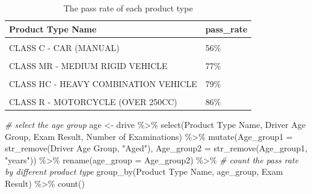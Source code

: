 \documentclass[11pt,a4paper,]{article}
\newenvironment{Shaded}{\begin{snugshade}}{\end{snugshade}}
\newcommand{\AttributeTok}[1]{\textcolor[rgb]{0.77,0.63,0.00}{#1}}
\newcommand{\CommentTok}[1]{\textcolor[rgb]{0.56,0.35,0.01}{\textit{#1}}}
\newcommand{\FunctionTok}[1]{\textcolor[rgb]{0.00,0.00,0.00}{#1}}
\newcommand{\NormalTok}[1]{#1}
\newcommand{\OtherTok}[1]{\textcolor[rgb]{0.56,0.35,0.01}{#1}}
\newcommand{\SpecialCharTok}[1]{\textcolor[rgb]{0.00,0.00,0.00}{#1}}
\newcommand{\StringTok}[1]{\textcolor[rgb]{0.31,0.60,0.02}{#1}}
\begin{document}
\begin{table}[!h]

\caption{\label{tab:unnamed-chunk-4}The pass rate of each product type}
\centering
\begin{tabular}[t]{ll}
\toprule
Product Type Name & pass\_rate\\
\midrule
\cellcolor{gray!6}{CLASS CA - CAR (AUTOMATIC)} & \cellcolor{gray!6}{53\%}\\
CLASS C - CAR (MANUAL) & 56\%\\
\cellcolor{gray!6}{CLASS HR - HEAVY RIGID VEHICLE} & \cellcolor{gray!6}{70\%}\\
CLASS MR - MEDIUM RIGID VEHICLE & 77\%\\
\cellcolor{gray!6}{CLASS RE - MOTORCYCLE (UP TO 250CC} & \cellcolor{gray!6}{77\%}\\
\addlinespace
CLASS HC - HEAVY COMBINATION VEHICLE & 79\%\\
\cellcolor{gray!6}{CLASS LR - LIGHT RIGID VEHICLE} & \cellcolor{gray!6}{83\%}\\
CLASS R - MOTORCYCLE (OVER 250CC) & 86\%\\
\bottomrule
\end{tabular}
\end{table}

\begin{Shaded}
\begin{Highlighting}[]
\CommentTok{\# select the age group}
\NormalTok{age }\OtherTok{\textless{}{-}}\NormalTok{ drive }\SpecialCharTok{\%\textgreater{}\%}
  \FunctionTok{select}\NormalTok{(}\StringTok{\textasciigrave{}}\AttributeTok{Product Type Name}\StringTok{\textasciigrave{}}\NormalTok{, }\StringTok{\textasciigrave{}}\AttributeTok{Driver Age Group}\StringTok{\textasciigrave{}}\NormalTok{, }\StringTok{\textasciigrave{}}\AttributeTok{Exam Result}\StringTok{\textasciigrave{}}\NormalTok{, }\StringTok{\textasciigrave{}}\AttributeTok{Number of Examinations}\StringTok{\textasciigrave{}}\NormalTok{) }\SpecialCharTok{\%\textgreater{}\%}
  \FunctionTok{mutate}\NormalTok{(}\AttributeTok{Age\_group1 =} \FunctionTok{str\_remove}\NormalTok{(}\StringTok{\textasciigrave{}}\AttributeTok{Driver Age Group}\StringTok{\textasciigrave{}}\NormalTok{, }\StringTok{"Aged"}\NormalTok{),}
         \AttributeTok{Age\_group2 =} \FunctionTok{str\_remove}\NormalTok{(Age\_group1, }\StringTok{"years"}\NormalTok{)) }\SpecialCharTok{\%\textgreater{}\%}
  \FunctionTok{rename}\NormalTok{(}\AttributeTok{age\_group =}\NormalTok{ Age\_group2) }\SpecialCharTok{\%\textgreater{}\%}
\CommentTok{\# count the pass rate by different product type}
  \FunctionTok{group\_by}\NormalTok{(}\StringTok{\textasciigrave{}}\AttributeTok{Product Type Name}\StringTok{\textasciigrave{}}\NormalTok{, age\_group, }\StringTok{\textasciigrave{}}\AttributeTok{Exam Result}\StringTok{\textasciigrave{}}\NormalTok{) }\SpecialCharTok{\%\textgreater{}\%}
  \FunctionTok{count}\NormalTok{()}
\end{Highlighting}
\end{Shaded}
\end{document}
